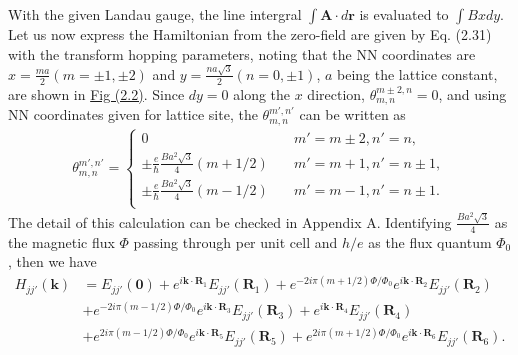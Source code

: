 \documentclass{report}
\begin{document}
With the given Landau gauge, the line intergral $\int \mathbf{A} \cdot d\mathbf{r}$ is evaluated to $\int Bx dy$. Let us now express the Hamiltonian from the zero-field are given by Eq. (2.31) with the transform hopping parameters, noting that the NN coordinates are $x = \frac{ma}{2}(m = \pm 1, \pm 2)$ and $y = \frac{na\sqrt{3}}{2}(n = 0,\pm 1)$, $a$ being the lattice constant, are shown in \hyperref[fig:site index]{Fig (2.2)}. Since $dy = 0$ along the $x$ direction, $\theta_{m,n}^{m \pm 2, n} = 0$, and using NN coordinates given for lattice site, the $\theta_{m,n}^{m',n'}$ can be written as
\begin{gather}
	\theta_{m,n}^{m',n'} =
	\begin{cases}
		0                                                         & \quad m' = m \pm 2, n' = n  ,    \\
		\pm \frac{e}{\hbar} \frac{B a^{2} \sqrt{3}}{4} (m + 1 /2) & \quad m' = m + 1, n' = n \pm 1 , \\
		\pm \frac{e}{\hbar} \frac{B a^{2} \sqrt{3}}{4} (m - 1 /2) & \quad m' = m - 1, n' = n \pm 1.  \\
	\end{cases}
\end{gather}
The detail of this calculation can be checked in Appendix A. Identifying $\frac{B a^{2} \sqrt{3}}{4}$ as the magnetic flux $\Phi$ passing through per unit cell and $h / e$ as the flux quantum $\Phi_{0}$, then we have
\begin{equation}
	\begin{aligned}
		H_{jj'}(\mathbf{k})
		 & = E_{jj'}(\mathbf{0}) + e^{i \mathbf{k} \cdot \mathbf{R}_{1}} E_{jj'}(\mathbf{R}_{1}) + e^{-2i\pi(m + 1/2)\Phi / \Phi_{0}} e^{i \mathbf{k} \cdot \mathbf{R}_{2}} E_{jj'}(\mathbf{R}_{2})             \\
		 & + e^{-2i\pi(m - 1/2)\Phi / \Phi_{0}} e^{i \mathbf{k} \cdot \mathbf{R}_{3}} E_{jj'}(\mathbf{R}_{3}) + e^{i \mathbf{k} \cdot \mathbf{R}_{4}} E_{jj'}(\mathbf{R}_{4})                                   \\
		 & + e^{2i\pi(m - 1/2)\Phi / \Phi_{0}} e^{i \mathbf{k} \cdot \mathbf{R}_{5}} E_{jj'}(\mathbf{R}_{5}) + e^{2i\pi(m + 1/2)\Phi / \Phi_{0}} e^{i \mathbf{k} \cdot \mathbf{R}_{6}} E_{jj'}(\mathbf{R}_{6}).
	\end{aligned}
\end{equation}
\end{document}
